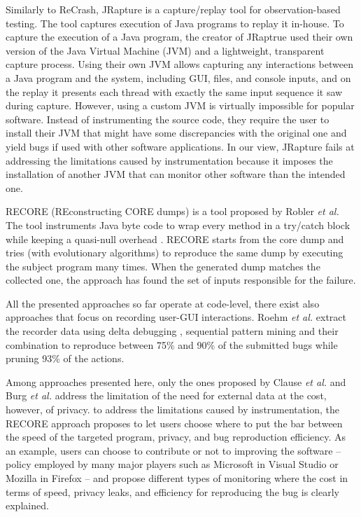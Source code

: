 \documentclass[times]{smrauth}
\begin{document}
Similarly to ReCrash, JRapture \cite{Steven2000} is a capture/replay tool for observation-based testing. The tool captures execution of Java programs to replay it in-house. To capture the execution of a Java program, the creator of JRaptrue used their own version of the Java Virtual Machine (JVM) and a lightweight, transparent capture process. 
Using their own JVM allows capturing any interactions between a Java program and the system, including GUI, files, and console inputs, and on the replay it presents each thread with exactly the same input sequence it saw during capture. 
However, using a custom JVM is virtually impossible for popular software. 
Instead of instrumenting the source code, they require the user to install their JVM that might have some discrepancies with the original one and yield bugs if used with other software applications. 
In our view,  JRapture fails at addressing the limitations caused by instrumentation because it imposes the installation of another JVM that can monitor other software than the intended one.

RECORE (REconstructing CORE dumps) is a tool proposed by Robler {\it et al.} The tool instruments Java byte code to wrap every method in a try/catch block while keeping a quasi-null overhead \cite{Rossler2013}. RECORE starts from the core dump and tries (with evolutionary algorithms) to reproduce the same dump by executing the subject program many times. When the generated dump matches the collected one, the approach has found the set of inputs responsible for the failure.

All the presented approaches so far operate at code-level, there exist also approaches \cite{Herbold2011,Roehm2015} that focus on recording user-GUI interactions. 
Roehm {\it et al.} extract the recorder data using delta debugging \cite{Zeller2002}, sequential pattern mining and their combination to reproduce between 75\% and 90\% of the submitted bugs while pruning 93\% of the actions.

Among approaches presented here, only the ones proposed by Clause {\it et al.} and Burg {\it et al.} address the limitation of the need for external data  at the cost, however, of privacy. to address the limitations caused by instrumentation,  the RECORE approach proposes to let users choose where to put the bar between the speed of the targeted program, privacy, and bug reproduction efficiency. As an example, users can choose to contribute or not to improving the software -- policy employed by many major players such as Microsoft in Visual Studio or Mozilla in Firefox -- and propose different types of monitoring where the cost in terms of speed, privacy leaks, and efficiency for reproducing the bug is clearly explained.
\end{document}
